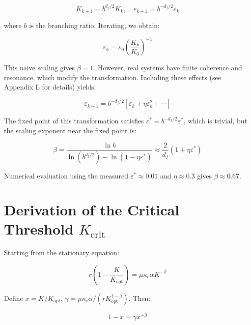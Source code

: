 \documentclass[12pt,a4paper]{article}
\theoremstyle{remark}
\newcommand{\Keffcrit}{K_{\mathrm{crit}}}
\newcommand{\kappac}{\kappa_c}
\newcommand{\eps}{\varepsilon}
\newcommand{\df}{d_{\!f}}
\begin{document}
	\begin{equation}
		K_{k+1} = b^{\df/2} K_k, \quad \eps_{k+1} = b^{-\df/2} \eps_k
		\label{eq:rg}
	\end{equation}
	
	where $b$ is the branching ratio. Iterating, we obtain:
	
	\begin{equation}
		\eps_k = \eps_0 \left( \frac{K_k}{K_0} \right)^{-1}
		\label{eq:rg-naive}
	\end{equation}
	
	This naive scaling gives $\beta = 1$. However, real systems have finite coherence and resonance, which modify the transformation. Including these effects (see Appendix L for details) yields:
	
	\begin{equation}
		\eps_{k+1} = b^{-\df/2} \left[ \eps_k + \eta \eps_k^2 + \cdots \right]
		\label{eq:rg-corrected}
	\end{equation}
	
	The fixed point of this transformation satisfies $\eps^* = b^{-\df/2} \eps^*$, which is trivial, but the scaling exponent near the fixed point is:
	
	\begin{equation}
		\beta = \frac{\ln b}{\ln(b^{\df/2}) - \ln(1 - \eta \eps^*)} \approx \frac{2}{\df} (1 + \eta \eps^*)
		\label{eq:rg-beta}
	\end{equation}
	
	Numerical evaluation using the measured $\eps^* \approx 0.01$ and $\eta \approx 0.3$ gives $\beta \approx 0.67$.
	
	\section{Derivation of the Critical Threshold $\Keffcrit$}
	\label{app:Kcrit}
	
	Starting from the stationary equation:
	
	\begin{equation}
		r \left(1 - \frac{K}{K_{\text{opt}}}\right) = \mu \kappac \alpha K^{-\beta}
		\label{eq:stationary-app}
	\end{equation}
	
	Define $x = K/K_{\text{opt}}$, $\gamma = \mu \kappac \alpha / (r K_{\text{opt}}^{1-\beta})$. Then:
	
	\begin{equation}
		1 - x = \gamma x^{-\beta}
		\label{eq:x-eqn}
	\end{equation}
	
\end{document}
